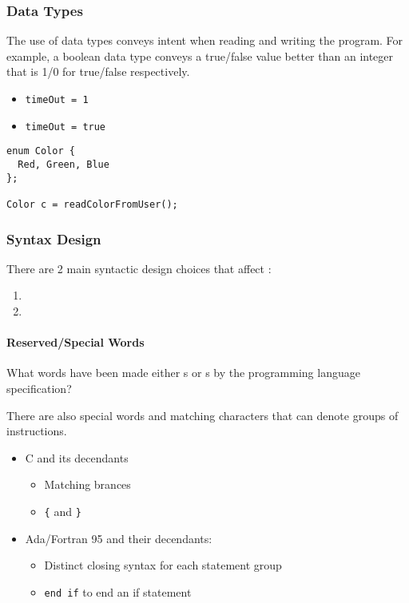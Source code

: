 \subsubsection{Data Types}\label{subsubsec:Data_Types}
The use of data types conveys intent when reading and writing the program.
For example, a boolean data type conveys a true/false value better than an integer that is 1/0 for true/false respectively.
\begin{itemize}[noitemsep]
\item \texttt{timeOut = 1}
\item \texttt{timeOut = true}
\end{itemize}

\begin{verbatim}
enum Color {
  Red, Green, Blue
};

Color c = readColorFromUser();
\end{verbatim}

\subsubsection{Syntax Design}\label{subsubsec:Syntax_Design}
There are 2 main syntactic design choices that affect :
\begin{enumerate}[noitemsep]
\item {}
\item {}
\end{enumerate}

\paragraph{Reserved/Special Words}\label{par:Reserved_Words}
What words have been made either s or s by the programming language specification?

There are also special words and matching characters that can denote groups of instructions.
\begin{itemize}[noitemsep]
\item C and its decendants
  \begin{itemize}[noitemsep]
  \item Matching brances
  \item \texttt{\{} and \texttt{\}}
  \end{itemize}
\item Ada/Fortran 95 and their decendants:
  \begin{itemize}[noitemsep]
  \item Distinct closing syntax for each statement group
  \item \texttt{end if} to end an if statement
  \end{itemize}
\end{itemize}

